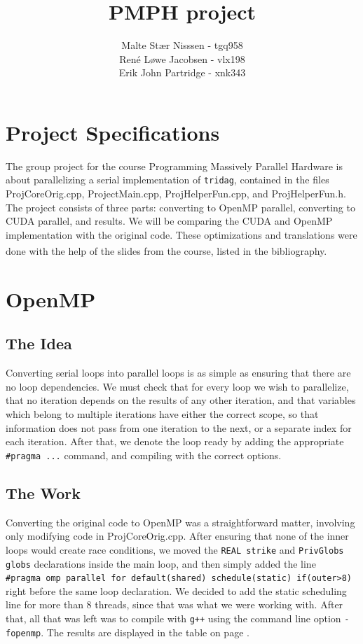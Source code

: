 \documentclass[12pt, oneside]{article}
\title{PMPH project}
\author{Malte Stær Nisssen - tgq958 \\René Løwe Jacobsen - vlx198 \\ Erik John Partridge - xnk343}
\begin{document}
	\maketitle
\section{Project Specifications}
The group project for the course Programming Massively Parallel Hardware is about parallelizing a serial implementation of \texttt{tridag}, contained in the files ProjCoreOrig.cpp, ProjectMain.cpp, ProjHelperFun.cpp, and ProjHelperFun.h. The project consists of three parts: converting to OpenMP parallel, converting to CUDA parallel, and results. We will be comparing the CUDA and OpenMP implementation with the original code. These optimizations and translations were done with the help of the slides from the course, listed in the bibliography. \textsuperscript{\cite{l5slides}\cite{flattening}\cite{projectslides}}
\section{OpenMP}
\subsection{The Idea}
Converting serial loops into parallel loops is as simple as ensuring that there are no loop dependencies. We must check that for every loop we wish to parallelize, that no iteration depends on the results of any other iteration, and that variables which belong to multiple iterations have either the correct scope, so that information does not pass from one iteration to the next, or a separate index for each iteration. After that, we denote the loop ready by adding the appropriate \texttt{\#pragma ...} command, and compiling with the correct options.
\subsection{The Work}
Converting the original code to OpenMP was a straightforward matter, involving only modifying code in ProjCoreOrig.cpp. After ensuring that none of the inner loops would create race conditions, we moved the \texttt{REAL strike} and \texttt{PrivGlobs globs} declarations inside the main loop, and then simply added the line\\
\texttt{\#pragma omp parallel for default(shared) schedule(static) if(outer>8)} right before the same loop declaration. We decided to add the static scheduling line for more than 8 threads, since that was what we were working with. After that, all that was left was to compile with \texttt{g++} using the command line option \texttt{-fopenmp}. The results are displayed in the table on page \pageref{fig:results}.
\end{document}
